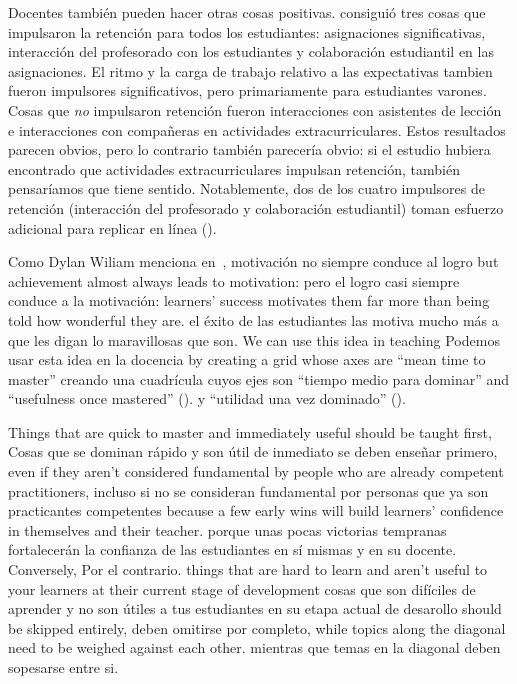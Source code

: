 Docentes también pueden hacer otras cosas positivas.
\cite{Bark2014} consiguió tres cosas que impulsaron la retención para todos los estudiantes:
asignaciones significativas,
interacción del profesorado con los estudiantes
y colaboración estudiantil en las asignaciones.
El ritmo y la carga de trabajo relativo a las expectativas tambien fueron impulsores significativos,
pero primariamente para estudiantes varones.
Cosas que \emph{no} impulsaron retención
fueron interacciones con asistentes de lección
e interacciones con compañeras en actividades extracurriculares.
Estos resultados parecen obvios,
pero lo contrario también parecería obvio:
si el estudio hubiera encontrado que actividades extracurriculares impulsan retención,
también pensaríamos que tiene sentido.
Notablemente,
dos de los cuatro impulsores de retención (interacción del profesorado y colaboración estudiantil)
toman esfuerzo adicional para replicar en línea ().


Como Dylan Wiliam menciona en~\cite{Hend2017},
motivación no siempre conduce al logro 
but achievement almost always leads to motivation:
pero el logro casi siempre conduce a la motivación:
learners' success motivates them far more than being told how wonderful they are.
el éxito de las estudiantes las motiva mucho más a que les digan lo maravillosas que son.
We can use this idea in teaching
Podemos usar esta idea en la docencia
by creating a grid whose axes are ``mean time to master''
creando una cuadrícula cuyos ejes son ``tiempo medio para dominar”
and ``usefulness once mastered'' ().
y ``utilidad una vez dominado” ().


Things that are quick to master and immediately useful should be taught first,
Cosas que se dominan rápido y son útil de inmediato se deben enseñar primero,
even if they aren't considered fundamental by people who are already competent practitioners,
incluso si no se consideran fundamental por personas que ya son practicantes competentes
because a few early wins will build learners' confidence in themselves and their teacher.
porque unas pocas victorias tempranas fortalecerán la confianza de las estudiantes en sí mismas y en su docente.
Conversely,
Por el contrario.
things that are hard to learn and aren't useful to your learners at their current stage of development
cosas que son difíciles de aprender y no son útiles a tus estudiantes en su etapa actual de desarollo
should be skipped entirely,
deben omitirse por completo,
while topics along the diagonal need to be weighed against each other.
mientras que temas en la diagonal deben sopesarse entre si.

